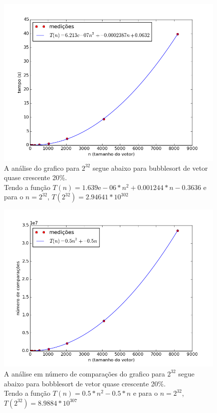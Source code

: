 \documentclass[12pt,a4paper,twoside]{report}
\begin{document}


\begin{figure}[ht]
\centering \includegraphics[scale=0.8]{../bolha/imagens/bolhaQuaseCresc200.png}
\caption{A análise do grafico para $2^{32}$ segue abaixo para bubblesort de vetor quase crescente 20\%.\\
Tendo a função $T(n) = 1.639\mathrm{e}-06*n^2+0.001244*n-0.3636$ e para o $n =2^{32}$, $T(2^{32}) = 2.94641 * 10^{302}$}
\label{fig:bolhaQuaseCresc200}
\end{figure}

\begin{figure}[ht]
\centering \includegraphics[scale=0.8]{../bolha/imagens/bolhaQuaseCresc201.png}
\caption{A análise em número de comparações do grafico para $2^{32}$ segue abaixo para bobblesort de vetor quase crescente 20\%.\\
Tendo a função $T(n) = 0.5*n^2 - 0.5*n$ e para o $n =2^{32}$, $T(2^{32}) = 8.9884 * 10^{307}$}
\label{fig:bolhaQuaseCresc201}
\end{figure}
\end{document}
